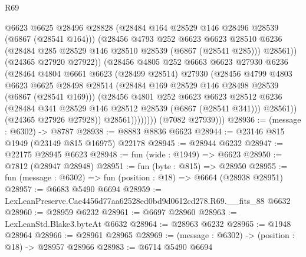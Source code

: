 \begin{lexlean}{R69}
\begin{coremodule}
{                          @6623
                          @6625
                          @28496
                          @28828
                          (@28484 @164 @28529 @146 @28496 @28539 (@6867 (@28541 @164)))
                          (@28456
                            @4793
                            @252
                            @6623
                            @6623
                            @28510
                            @6236
                            (@28484 @285 @28529 @146 @28510 @28539 (@6867 (@28541 @285)))
                            @28561))
                        (@24365 @27920 @27922))
                      (@28456
                        @4805
                        @252
                        @6663
                        @6623
                        @27930
                        @6236
                        (@28464
                          @4804
                          @6661
                          @6623
                          (@28499 @28514)
                          @27930
                          (@28456
                            @4799
                            @4803
                            @6623
                            @6625
                            @28498
                            @28514
                            (@28484 @169 @28529 @146 @28498 @28539 (@6867 (@28541 @169)))
                            (@28456
                              @4801
                              @252
                              @6623
                              @6623
                              @28512
                              @6236
                              (@28484 @341 @28529 @146 @28512 @28539 (@6867 (@28541 @341)))
                              @28561))
                          (@24365 @27926 @27928))
                        @28561))))))))
        (@7082 @27939)))
@28936 := (message : @6302) -> @8787
@28938 := @8883 @8836 @6623
@28944 := @23146 @815 @1949 (@23149 @815 @16975) @22178
@28945 := @28944 @6232
@28947 := @22175 @28945 @6623
@28948 := fun (wide : @1949) => @6623
@28950 := @7812 (@28947 @28948)
@28951 := fun (byte : @815) => @28950
@28955 := fun (message : @6302) => fun (position : @18) => @6664 (@28938 @28951)
@28957 := @6683 @5490 @6694
@28959 := LexLeanPreserve.Cae4456d77aa62528ed0bd9d0612cd278.R69.__fits_88 @6632
@28960 := @28959 @6232
@28961 := @6697 @28960
@28963 := LexLeanStd.Blake3.byteAt @6632
@28964 := @28963 @6232
@28965 := @1948 @28964
@28966 := @28961 @28965
@28969 := (message : @6302) -> (position : @18) -> @28957 @28966
@28983 := @6714
    @5490
    @6694
}
\end{coremodule}
\end{lexlean}
